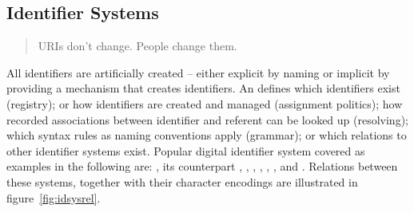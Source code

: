 \subsection{Identifier Systems}
\label{sec:idsystems}
\label{sec:dns}

\begin{quotation}%
URIs don't change. People change them.\\
\end{quotation}

\noindent
All identifiers are artificially created -- either explicit by naming
or implicit by providing a mechanism that creates identifiers. An 
 defines which identifiers exist (registry); or how
identifiers are created and managed (assignment politics); how recorded 
associations between identifier and referent can be looked up (resolving); 
which syntax rules as naming conventions apply (grammar); or which relations 
to other identifier systems exist. Popular digital identifier system covered 
as examples in the following are: , 
its counterpart , 
, ,
, ,  
, and
. Relations between these systems, 
together with their character encodings are illustrated in 
figure~\ref{fig:idsysrel}.

